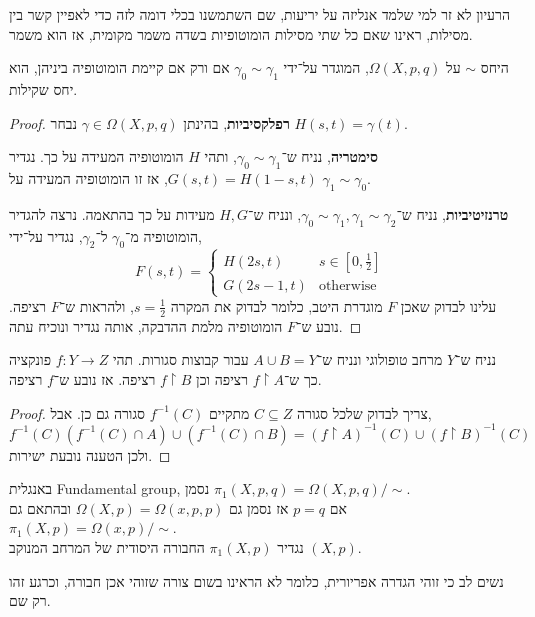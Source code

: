 הרעיון לא זר למי שלמד אנליזה על יריעות, שם השתמשנו בכלי דומה לזה כדי לאפיין קשר בין מסילות, ראינו שאם כל שתי מסילות הומוטופיות בשדה משמר מקומית, אז הוא משמר.
\begin{proposition}
	היחס $\sim$ על $\Omega(X, p, q)$, המוגדר על־ידי $\gamma_0 \sim \gamma_1$ אם ורק אם קיימת הומוטופיה ביניהן,
	הוא יחס שקילות.
\end{proposition}
\begin{proof}
	\textbf{רפלקסיביות},
	בהינתן $\gamma \in \Omega(X, p, q)$ נבחר $H(s, t) = \gamma(t)$.

	\textbf{סימטריה},
	נניח ש־$\gamma_0 \sim \gamma_1$, ותהי $H$ הומוטופיה המעידה על כך.
	נגדיר $G(s, t) = H(1 - s, t)$, אז זו הומוטופיה המעידה על $\gamma_1 \sim \gamma_0$.

	\textbf{טרנזיטיביות},
	נניח ש־$\gamma_0 \sim \gamma_1, \gamma_1 \sim \gamma_2$, ונניח ש־$H, G$ מעידות על כך בהתאמה.
	נרצה להגדיר הומוטופיה מ־$\gamma_0$ ל־$\gamma_2$, נגדיר על־ידי,
	\[
		F(s, t)
		= \begin{cases}
			H(2s, t) & s \in [0, \frac{1}{2}] \\
			G(2s - 1, t) & \text{otherwise}
		\end{cases}
	\]
	עלינו לבדוק שאכן $F$ מוגדרת היטב, כלומר לבדוק את המקרה $s = \frac{1}{2}$, ולהראות ש־$F$ רציפה.
	נובע ש־$F$ הומוטופיה מלמת ההדבקה, אותה נגדיר ונוכיח עתה.
\end{proof}
\begin{lemma}
	נניח ש־$Y$ מרחב טופולוגי ונניח ש־$A \cup B = Y$ עבור קבוצות סגורות.
	תהי $f : Y \to Z$ פונקציה כך ש־$f \restriction A$ רציפה וכן $f \restriction B$ רציפה.
	אז נובע ש־$f$ רציפה.
\end{lemma}
\begin{proof}
	צריך לבדוק שלכל סגורה $C \subseteq Z$ מתקיים $f^{-1}(C)$ סגורה גם כן.
	אבל,
	\[
		f^{-1}(C)
		(f^{-1}(C) \cap A) \cup (f^{-1}(C) \cap B)
		= {(f \restriction A)}^{-1}(C) \cup {(f \restriction B)}^{-1}(C)
	\]
	ולכן הטענה נובעת ישירות.
\end{proof}
\begin{definition}
	באנגלית Fundamental group,
	נסמן $\pi_1(X, p, q) = \Omega(X, p, q) / \sim$. \\
	אם $p = q$ אז נסמן גם $\Omega(X, p) = \Omega(x, p, p)$ ובהתאם גם $\pi_1(X, p) = \Omega(x, p) / \sim$. \\
	נגדיר $\pi_1(X, p)$ החבורה היסודית של המרחב המנוקב $(X, p)$.
\end{definition}
נשים לב כי זוהי הגדרה אפריורית, כלומר לא הראינו בשום צורה שזוהי אכן חבורה, וכרגע זהו רק שם.
